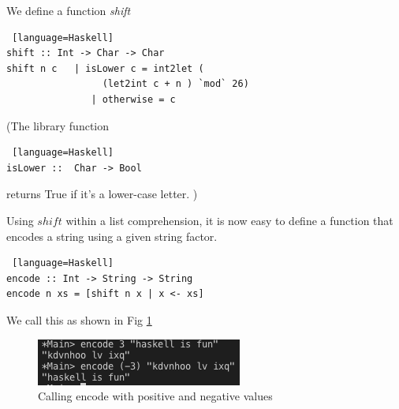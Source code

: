 \documentclass{beamer}
\def\frametitle#1{}
\begin{document}
 \begin{frame}[fragile, label=encoding2]
  \frametitle{Encoding and Decoding contd. } 
 We define a function \textit{shift} 
 

  \begin{onlyenv}
  \begin{lstlisting} [language=Haskell]
shift :: Int -> Char -> Char
shift n c   | isLower c = int2let ( 
                 (let2int c + n ) `mod` 26)
               | otherwise = c
 \end{lstlisting}
  \end{onlyenv}    
  
  (The library function
   \begin{onlyenv}
  \begin{lstlisting} [language=Haskell]
isLower ::  Char -> Bool
 \end{lstlisting}
  \end{onlyenv}    
returns True if it's a lower-case letter.  )
  \end{frame}

\begin{frame}[fragile, label=encoding3]
  \frametitle{Encoding and Decoding contd. } 
  Using $shift$ within a list comprehension, it is now easy to define a function that encodes a string using a given string factor.
    \begin{onlyenv}
  \begin{lstlisting} [language=Haskell]
encode :: Int -> String -> String 
encode n xs = [shift n x | x <- xs]
 \end{lstlisting}
  \end{onlyenv}    
 
  We call this as shown in Fig \ref{encode}
  
  \begin{figure}
			\centering
			\includegraphics[page=1,width=.5\textwidth]{img/02.png}
			\caption {Calling encode with positive and negative values}
			\label{encode}
		\end{figure}
\end{frame}
\end{document}
